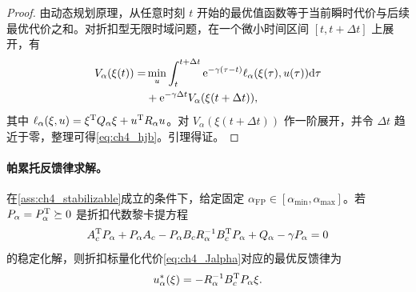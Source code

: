 \begin{proof}
由动态规划原理，从任意时刻 $t$ 开始的最优值函数等于当前瞬时代价与后续最优代价之和。对折扣型无限时域问题，在一个微小时间区间 $[t,t+\Delta t]$ 上展开，有
\begin{align}
  V_\alpha(\xi(t))=&\min_u\int_t^{t+\Delta t}\mathrm{e}^{-\gamma(\tau-t)}\ell_\alpha(\xi(\tau),u(\tau))\mathrm{d}\tau \\
  &+\mathrm{e}^{-\gamma\Delta t}V_\alpha(\xi(t+\Delta t)),
\end{align}
其中 $\ell_\alpha(\xi,u)=\xi^{\mathrm{T}}Q_\alpha\xi+u^{\mathrm{T}}R_\alpha u$。对 $V_\alpha(\xi(t+\Delta t))$ 作一阶展开，并令 $\Delta t$ 趋近于零，整理可得\eqref{eq:ch4_hjb}。引理得证。
\end{proof}

\paragraph{帕累托反馈律求解。}
\label{subsec:ch4_pareto_law}

\begin{theorem}[标称系统下的折扣帕累托最优反馈律]
\label{thm:ch4_discount_lqr}
在\cref{ass:ch4_stabilizable}成立的条件下，给定固定 $\alpha_{\mathrm{FP}}\in[\alpha_{\min},\alpha_{\max}]$。若 $P_\alpha=P_\alpha^{\mathrm{T}}\succeq0$ 是折扣代数黎卡提方程
\begin{equation}
  A_c^{\mathrm{T}}P_\alpha+P_\alpha A_c-P_\alpha B_cR_\alpha^{-1}B_c^{\mathrm{T}}P_\alpha+Q_\alpha-\gamma P_\alpha=0
  \label{eq:ch4_discount_are}
\end{equation}
的稳定化解，则折扣标量化代价\eqref{eq:ch4_Jalpha}对应的最优反馈律为
\begin{equation}
  u_\alpha^*(\xi)=-R_\alpha^{-1}B_c^{\mathrm{T}}P_\alpha\xi .
  \label{eq:ch4_u_star}
\end{equation}
\end{theorem}

